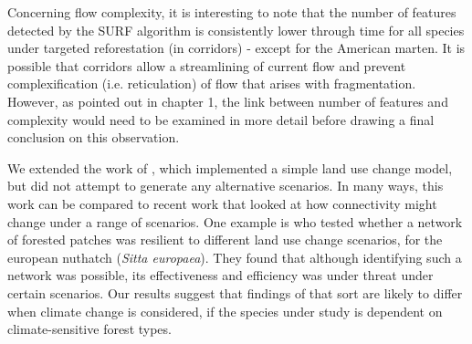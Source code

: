 {Concerning flow complexity, it is interesting to note that the number of features detected by the SURF algorithm is consistently lower through time for all species under targeted reforestation (in corridors) - except for the American marten. It is possible that corridors allow a streamlining of current flow and prevent complexification (i.e. reticulation) of flow that arises with fragmentation. However, as pointed out in chapter 1, the link between number of features and complexity would need to be examined in more detail before drawing a final conclusion on this observation. 

We extended the work of \cite{albert_applying_2017}, which implemented a simple land use change model, but did not attempt to generate any alternative scenarios. In many ways, this work can be compared to recent work that looked at how connectivity might change under a range of scenarios. One example is \cite{rubio_sustaining_2012} who tested whether a network of forested patches was resilient to different land use change scenarios, for the european nuthatch (\textit{Sitta europaea}). They found that although identifying such a network was possible, its effectiveness and efficiency was under threat under certain scenarios. Our results suggest that findings of that sort are likely to differ when climate change is considered, if the species under study is dependent on climate-sensitive forest types. 

}
